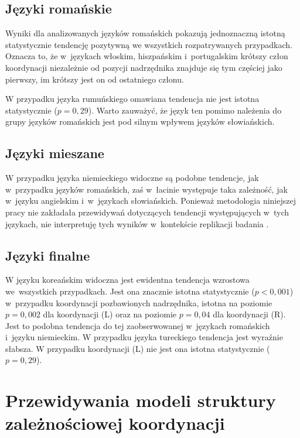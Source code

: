 \subsection{Języki romańskie}

Wyniki dla analizowanych języków romańskich pokazują jednoznaczną istotną statystycznie tendencję pozytywną we wszystkich rozpatrywanych przypadkach. Oznacza to, że w~językach włoskim, hiszpańskim i~portugalskim krótszy człon koordynacji niezależnie od pozycji nadrzędnika znajduje się tym częściej jako pierwszy, im krótszy jest on od ostatniego członu. 

W przypadku języka rumuńskiego omawiana tendencja nie jest istotna statystycznie ($p=0{,}29$). Warto zauważyć, że język ten pomimo należenia do grupy języków romańskich jest pod silnym wpływem języków słowiańskich.

\subsection{Języki mieszane}

W przypadku języka niemieckiego widoczne są podobne tendencje, jak w~przypadku języków romańskich, zaś w~łacinie występuje taka zależność, jak w~języku angielskim i~w~językach słowiańskich. Ponieważ metodologia niniejszej pracy nie zakładała przewidywań dotyczących tendencji występujących w~tych językach, nie interpretuję tych wyników w~kontekście replikacji badania \cite{przepiorkowski2023conjunct}.

\subsection{Języki finalne}

W języku koreańskim widoczna jest ewidentna tendencja wzrostowa we~wszystkich przypadkach. Jest ona znacznie istotna statystycznie ($p<0{,}001$) w~przypadku koordynacji pozbawionych nadrzędnika, istotna na poziomie $p=0{,}002$ dla koordynacji (L) oraz na poziomie $p=0{,}04$ dla koordynacji (R). Jest to podobna tendencja do tej zaobserwowanej w~językach romańskich i~języku niemieckim. W przypadku języka tureckiego tendencja jest wyraźnie słabsza. W przypadku koordynacji (L) nie jest ona istotna statystycznie ($p=0{,}29$).

\section{Przewidywania modeli struktury zależnościowej koordynacji}


